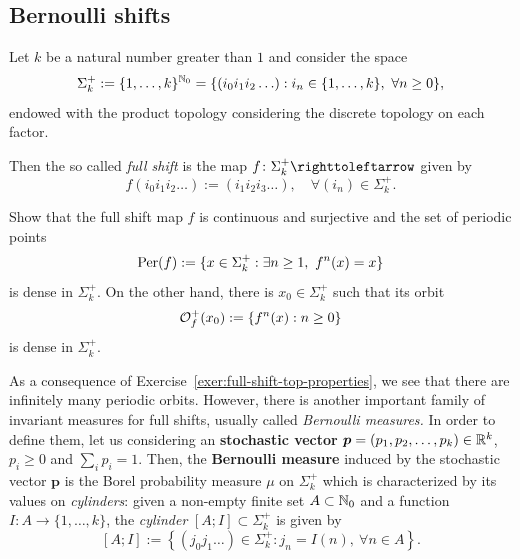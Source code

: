 \subsection{Bernoulli shifts}
\label{sec:bernoulli-shifts}

Let $k$ be a natural number greater than $1$ and consider the space
\begin{displaymath}
  \Sigma_k^+:=\{1,\ldots,k\}^{\mathbb{N}_0}=\{(i_0i_1i_2\ldots) : i_n\in\{1,\ldots,k\},\ \forall n\geq 0\},
\end{displaymath}
endowed with the product topology considering the discrete topology on each factor.

Then the so called \emph{full shift} is the map $f\colon\Sigma_k^+\carr$ given by
\begin{displaymath}
  f(i_0i_1i_2\ldots):=(i_1i_2i_3\ldots), \quad\forall (i_n)\in\Sigma_k^+.
\end{displaymath}

\begin{exercise}\label{exer:full-shift-top-properties}
  Show that the full shift map $f$ is continuous and surjective and the set of periodic points
  \begin{displaymath}
    \Per(f):=\{x\in\Sigma_k^+ : \exists n\geq 1,\ f^n(x)=x\}
  \end{displaymath}
  is dense in $\Sigma_k^+$. On the other hand, there is $x_0\in\Sigma_k^+$ such that its orbit
  \begin{displaymath}
    \mathcal{O}_f^+(x_0):=\{f^n(x) : n\geq 0\}
  \end{displaymath}
  is dense in $\Sigma_k^+$.
\end{exercise}

As a consequence of Exercise~\ref{exer:full-shift-top-properties}, we see that there are infinitely many periodic orbits. However, there is another important family of invariant measures for full shifts, usually called \emph{Bernoulli measures.} In order to define them, let us considering an \textbf{stochastic vector} $\boldsymbol{p}=(p_1,p_2,\ldots,p_k)\in\mathbb{R}^k$, \ie~$p_i\geq 0$ and $\sum_i p_i=1$. Then, the \textbf{Bernoulli measure} induced by the stochastic vector $\boldsymbol{p}$ is the Borel probability measure $\mu$ on $\Sigma_k^+$ which is characterized by its values on \emph{cylinders}: given a non-empty finite set $A\subset\mathbb{N}_0$ and a function $I\colon A\to\{1,\ldots,k\}$, the \emph{cylinder} $[A;I]\subset\Sigma_k^+$ is given by
\begin{equation}
  \label{eq:cylinder-definition}
  [A;I]:=\left\{(j_0j_1\ldots)\in\Sigma_k^+ : j_n=I(n),\ \forall n\in A\right\}.
\end{equation}

